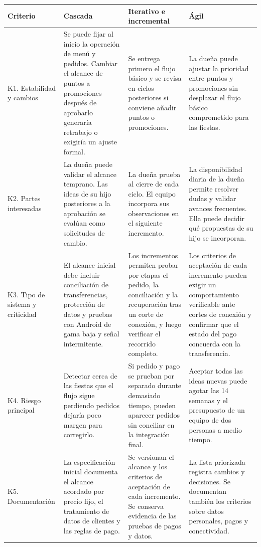 \documentclass[11pt,a4paper]{article}
\begin{document}
\begingroup
\small
\setlength{\tabcolsep}{4pt}
\begin{xltabular}{\textwidth}{|p{0.17\textwidth}|X|X|X|}
\hline
{}
\textbf{Criterio} & \textbf{Cascada} &
\textbf{Iterativo e incremental} & \textbf{Ágil} \\ \hline
\endhead

K1. Estabilidad y cambios &
Se puede fijar al inicio la operación de menú y pedidos. Cambiar el alcance de puntos a promociones después de aprobarlo generaría retrabajo o exigiría un ajuste formal. &
Se entrega primero el flujo básico y se revisa en ciclos posteriores si conviene añadir puntos o promociones. &
La dueña puede ajustar la prioridad entre puntos y promociones sin desplazar el flujo básico comprometido para las fiestas.
\\ \hline

K2. Partes interesadas &
La dueña puede validar el alcance temprano. Las ideas de su hijo posteriores a la aprobación se evalúan como solicitudes de cambio. &
La dueña prueba al cierre de cada ciclo. El equipo incorpora sus observaciones en el siguiente incremento. &
La disponibilidad diaria de la dueña permite resolver dudas y validar avances frecuentes. Ella puede decidir qué propuestas de su hijo se incorporan.
\\ \hline

K3. Tipo de sistema y criticidad &
El alcance inicial debe incluir conciliación de transferencias, protección de datos y pruebas con Android de gama baja y señal intermitente. &
Los incrementos permiten probar por etapas el pedido, la conciliación y la recuperación tras un corte de conexión, y luego verificar el recorrido completo. &
Los criterios de aceptación de cada incremento pueden exigir un comportamiento verificable ante cortes de conexión y confirmar que el estado del pago concuerda con la transferencia.
\\ \hline

K4. Riesgo principal &
Detectar cerca de las fiestas que el flujo sigue perdiendo pedidos dejaría poco margen para corregirlo. &
Si pedido y pago se prueban por separado durante demasiado tiempo, pueden aparecer pedidos sin conciliar en la integración final. &
Aceptar todas las ideas nuevas puede agotar las 14 semanas y el presupuesto de un equipo de dos personas a medio tiempo.
\\ \hline

K5. Documentación &
La especificación inicial documenta el alcance acordado por precio fijo, el tratamiento de datos de clientes y las reglas de pago. &
Se versionan el alcance y los criterios de aceptación de cada incremento. Se conserva evidencia de las pruebas de pagos y datos. &
La lista priorizada registra cambios y decisiones. Se documentan también los criterios sobre datos personales, pagos y conectividad.
\\ \hline
\end{xltabular}
\endgroup
\end{document}
